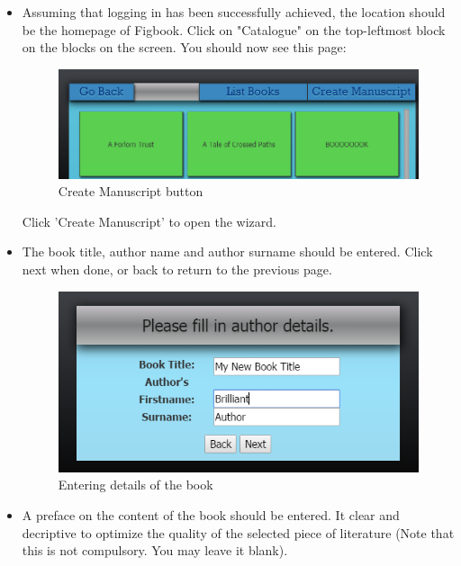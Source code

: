 	\begin{itemize}
		\item Assuming that logging in has been successfully achieved, the location should be the homepage of Figbook. Click on "Catalogue" on the top-leftmost block on the blocks on the screen. You should now see this page:
		
		\begin{figure}[h]
		\centering
			\includegraphics[scale=0.5]{images/viewBooks.png}
			\caption{Create Manuscript button}
		\end{figure}
		
		Click 'Create Manuscript' to open the wizard.
		\item The book title, author name and author surname should be entered. Click next when done, or back to return to the previous page.
		
		\begin{figure}[h]
			\centering
			\includegraphics[scale=0.5]{images/createManuscriptWizard.png}
			\caption{Entering details of the book}
		\end{figure}
		\item A preface on the content of the book should be entered. It clear and decriptive to optimize the quality of the selected piece of literature (Note that this is not compulsory. You may leave it blank). 
		

\end{itemize}

